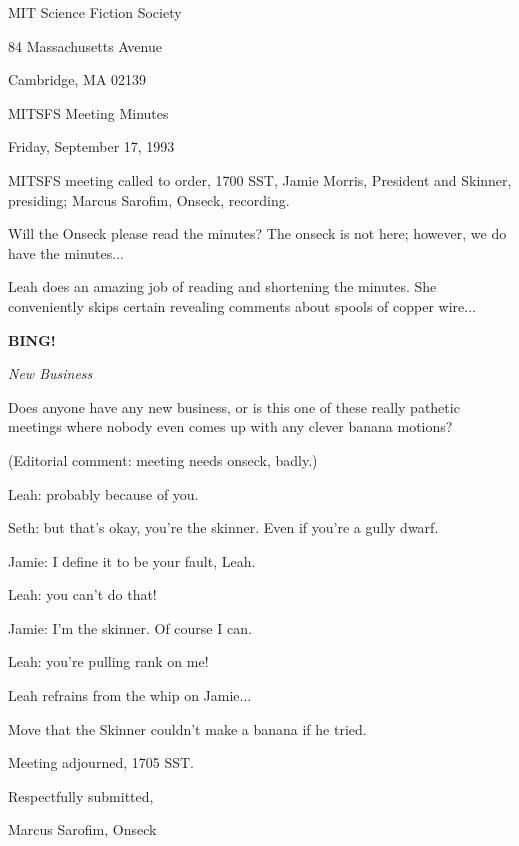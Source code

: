 \documentclass[12pt]{article}
\newcommand{\bing}{{\bf BING!} }
\newcommand{\goto}[1]{\bing \vskip 12pt \centerline{{\em{#1}}}}
\begin{document}
\begin{center}

MIT Science Fiction Society 

84 Massachusetts Avenue

Cambridge, MA 02139

\vspace{12pt}

MITSFS Meeting Minutes 

Friday, September 17, 1993

\end{center}
 
\vspace{18pt}

\setlength{\parskip}{6pt}

\noindent
MITSFS meeting called to order, 1700 SST,
Jamie Morris, President and Skinner, presiding; Marcus Sarofim, Onseck, recording.

Will the Onseck please read the minutes? The onseck is not here; however, we do have the minutes...

Leah does an amazing job of reading and shortening the minutes. She conveniently skips certain revealing comments about spools of copper wire...

\goto{New Business}

Does anyone have any new business, or is this one of these really pathetic meetings where nobody even comes up with any clever banana motions?

(Editorial comment: meeting needs onseck, badly.)

Leah: probably because of you.

Seth: but that's okay, you're the skinner. Even if you're a gully dwarf.

Jamie: I define it to be your fault, Leah.

Leah: you can't do that!

Jamie: I'm the skinner. Of course I can.

Leah: you're pulling rank on me!

Leah refrains from the whip on Jamie...

Move that the Skinner couldn't make a banana if he tried.

\vspace{12pt}

\noindent
Meeting adjourned, 1705 SST.

\vspace{18pt}

\centerline{Respectfully submitted,}
\centerline{Marcus Sarofim, Onseck}
\end{document}
